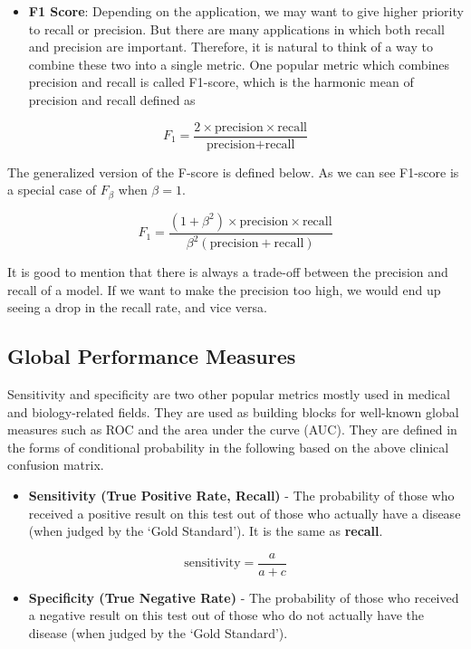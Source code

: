\documentclass[
]{book}
\providecommand{\tightlist}{%
  \setlength{\itemsep}{0pt}\setlength{\parskip}{0pt}}
\begin{document}
\begin{itemize}
\tightlist
\item
  \textbf{F1 Score}: Depending on the application, we may want to give higher priority to recall or precision. But there are many applications in which both recall and precision are important. Therefore, it is natural to think of a way to combine these two into a single metric. One popular metric which combines precision and recall is called F1-score, which is the harmonic mean of precision and recall defined as
\end{itemize}

\[
F_1 = \frac{2 \times \mbox{precision}\times \mbox{recall}}{\mbox{precision}+\mbox{recall}}
\]

The generalized version of the F-score is defined below. As we can see F1-score is a special case of \(F_{\beta}\) when \(\beta= 1\).

\[
F_1 = \frac{(1+\beta^2) \times \mbox{precision}\times \mbox{recall}}{\beta^2(\mbox{precision}+\mbox{recall})}
\]

It is good to mention that there is always a trade-off between the precision and recall of a model. If we want to make the precision too high, we would end up seeing a drop in the recall rate, and vice versa.

\hypertarget{global-performance-measures}{%
\subsection{Global Performance Measures}\label{global-performance-measures}}

Sensitivity and specificity are two other popular metrics mostly used in medical and biology-related fields. They are used as building blocks for well-known global measures such as ROC and the area under the curve (AUC). They are defined in the forms of conditional probability in the following based on the above clinical confusion matrix.

\begin{itemize}
\tightlist
\item
  \textbf{Sensitivity (True Positive Rate, Recall)} - The probability of those who received a positive result on this test out of those who actually have a disease (when judged by the `Gold Standard'). It is the same as \textbf{recall}.
\end{itemize}

\[
\mbox{sensitivity} = \frac{a}{a+c}
\]

\begin{itemize}
\tightlist
\item
  \textbf{Specificity (True Negative Rate)} - The probability of those who received a negative result on this test out of those who do not actually have the disease (when judged by the `Gold Standard').
\end{itemize}
\end{document}
